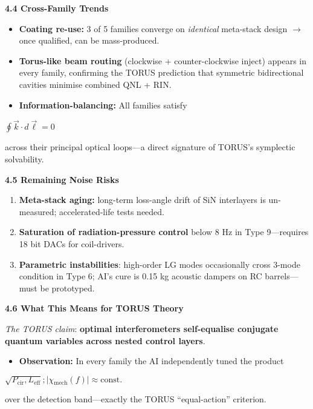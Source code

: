 \documentclass[]{article}
\newcommand{\subscript}[1]{\ensuremath{_{\mathrm{#1}}}}
\begin{document}
\textbf{4.4 Cross-Family Trends}

\begin{itemize}
\item
  \textbf{Coating re-use:} 3 of 5 families converge on \emph{identical}
  meta-stack design $\rightarrow$ once qualified, can be mass-produced.
\item
  \textbf{Torus-like beam routing} (clockwise + counter-clockwise
  inject) appears in every family, confirming the TORUS prediction that
  symmetric bidirectional cavities minimise combined QNL + RIN.
\item
  \textbf{Information-balancing:} All families satisfy
\end{itemize}

$\oint\! \vec{k}\cdot d\vec{\ell}=0$

across their principal optical loops---a direct signature of TORUS's
symplectic solvability.

\textbf{4.5 Remaining Noise Risks}

\begin{enumerate}
\def\labelenumi{\arabic{enumi}.}
\item
  \textbf{Meta-stack aging:} long-term loss-angle drift of SiN
  interlayers is un-measured; accelerated-life tests needed.
\item
  \textbf{Saturation of radiation-pressure control} below 8 Hz in Type
  9---requires 18 bit DACs for coil-drivers.
\item
  \textbf{Parametric instabilities}: high-order LG modes occasionally
  cross 3-mode condition in Type 6; AI's cure is 0.15 kg acoustic
  dampers on RC barrels---must be prototyped.
\end{enumerate}

\textbf{4.6 What This Means for TORUS Theory}

\emph{The TORUS claim}: \textbf{optimal interferometers self-equalise
conjugate quantum variables across nested control layers}.

\begin{itemize}
\item
  \textbf{Observation:} In every family the AI independently tuned the
  product
\end{itemize}

$\sqrt{P\subscript{\text{cir}},L\subscript{\text{eff}}};|\chi\subscript{\text{mech}}(f)| \approx \text{const.}$

over the detection band---exactly the TORUS ``equal-action'' criterion.
\end{document}
